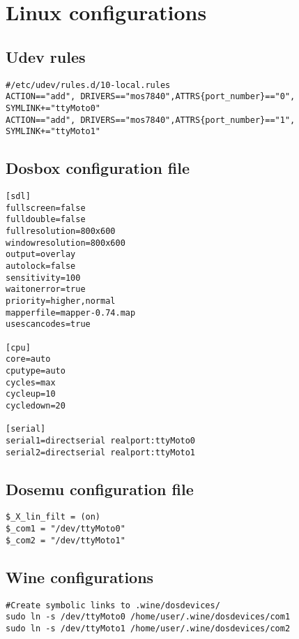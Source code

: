 \documentclass[11pt,a4paper,oneside,article]{memoir}
\begin{document}
\chapter{Linux configurations}\label{appx:first}

\section{Udev rules}
\begin{lstlisting}
#/etc/udev/rules.d/10-local.rules
ACTION=="add", DRIVERS=="mos7840",ATTRS{port_number}=="0", SYMLINK+="ttyMoto0"
ACTION=="add", DRIVERS=="mos7840",ATTRS{port_number}=="1", SYMLINK+="ttyMoto1"
\end{lstlisting}

\section{Dosbox configuration file}
\begin{lstlisting}
[sdl]
fullscreen=false
fulldouble=false
fullresolution=800x600
windowresolution=800x600
output=overlay
autolock=false
sensitivity=100
waitonerror=true
priority=higher,normal
mapperfile=mapper-0.74.map
usescancodes=true

[cpu]
core=auto
cputype=auto
cycles=max
cycleup=10
cycledown=20

[serial]
serial1=directserial realport:ttyMoto0
serial2=directserial realport:ttyMoto1
\end{lstlisting}

\section{Dosemu configuration file}
\begin{lstlisting}
$_X_lin_filt = (on)
$_com1 = "/dev/ttyMoto0"
$_com2 = "/dev/ttyMoto1"

\end{lstlisting}

\section{Wine configurations}
\begin{lstlisting}
#Create symbolic links to .wine/dosdevices/
sudo ln -s /dev/ttyMoto0 /home/user/.wine/dosdevices/com1
sudo ln -s /dev/ttyMoto1 /home/user/.wine/dosdevices/com2
\end{lstlisting}
\end{document}
